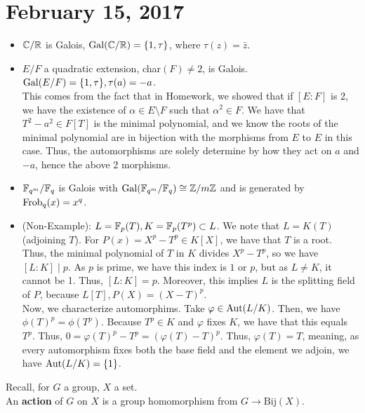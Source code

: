 \section{February 15, 2017} %
\begin{ex} \hspace{0.5cm}
    \begin{itemize}
        \item $\mathbb{C} / \mathbb{R}$ is Galois, $\operatorname{Gal}(\mathbb{C} /\mathbb{R}) = \{1, \tau\}$, where
        $\tau(z) = \bar{z}$.
        \item $E /F$ a quadratic extension, char$(F) \neq 2$, is Galois.
        $\operatorname{Gal}(E / F) = \{1, \tau\}, \tau(a) = -a$. \\
        This comes from the fact that in Homework, we showed that if $[E :F]$ is
        2, we have the existence of $\alpha \in E \setminus F$ such that $\alpha^2 \in F$.
        We have that $T^2 - a^2 \in F[T]$ is the minimal polynomial, and we know
        the roots of the minimal polynomial are in bijection with the morphisms
        from $E$ to $E$ in this case. Thus, the automorphisms are solely determine
        by how they act on $a$ and $-a$, hence the above 2 morphisms.
        \item $\mathbb{F}_{q^m} / \mathbb{F}_q$ is Galois with $\operatorname{Gal}(\mathbb{F}_{q^m} / \mathbb{F}_q) \cong \mathbb{Z} / m \mathbb{Z}$
        and is generated by $\operatorname{Frob}_q(x) = x^q$.
        \item (Non-Example): $L = \mathbb{F}_p(T), K = \mathbb{F}_p(T^p) \subset L$. We note that
        $L = K(T)$ (adjoining $T$). For $P(x) = X^p - T^p \in K[X]$, we have that $T$ is
        a root. Thus, the minimal polynomial of $T$ in $K$ divides $X^p - T^p$, so we have
        $[L:K] \mid p$. As $p$ is prime, we have this index is $1$ or $p$, but as $L \neq K$,
        it cannot be 1. Thus, $[L:K] = p$. Moreover, this implies $L$ is the
        splitting field of $P$, because $L[T], P(X) = (X - T)^p$. \\
        Now, we characterize automorphims. Take $\varphi \in \operatorname{Aut}(L / K)$. Then,
        we have $\phi(T)^p = \phi(T^p)$. Because $T^p \in K$ and $\varphi$ fixes $K$,
        we have that this equals $T^p$. Thus, $0 = \varphi(T)^p - T^p = (\varphi(T) - T)^p$.
        Thus, $\varphi(T) = T$, meaning, as every automorphism fixes both the base
        field and the element we adjoin, we have $\operatorname{Aut}(L/K) = \{1\}$.
    \end{itemize}
\end{ex}
\noindent Recall, for $G$ a group, $X$ a set. \\
An \textbf{action} of $G$ on $X$ is a group homomorphism from $G \rightarrow \textrm{Bij}(X)$.
